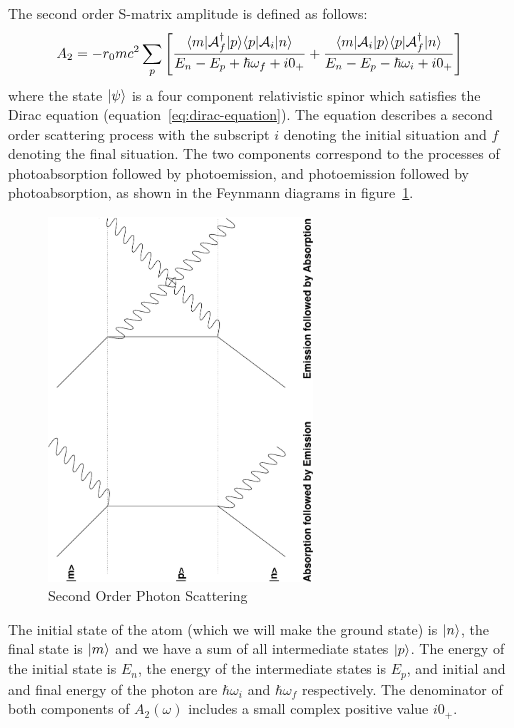 The second order S-matrix amplitude is defined as follows:
\begin{equation}
     A_2 = 
     -r_0 mc^2 \sum_p
     \left[
     \frac{
        \langle m| \mathcal{A}_f^\dag |p \rangle
        \langle p| \mathcal{A}_i |n \rangle
     }{
        E_n - E_p + \hbar\omega_f + i0_+
     }
     +
     \frac{
        \langle m| \mathcal{A}_i |p \rangle
        \langle p| \mathcal{A}_f^\dag |n \rangle
     }{
        E_n - E_p - \hbar\omega_i + i0_+
     }
     \right]
\end{equation}
where the state $|\psi \rangle$ is a four component relativistic spinor which
satisfies the Dirac equation (equation~\ref{eq:dirac-equation}). The equation describes a second
order scattering process with the subscript $i$ denoting the initial situation
and $f$ denoting the final situation. The two components correspond to the
processes of photoabsorption followed by photoemission, and photoemission
followed by photoabsorption, as shown in the Feynmann diagrams in 
figure~\ref{fig:feynmann}.
\begin{figure}[h]
    \begin{center}
        \includegraphics[angle=-90,width=7.0cm]{feynmann.eps}
    \end{center}
    \caption{Second Order Photon Scattering}
    \label{fig:feynmann}
\end{figure}

The initial state of the atom (which we will make
the ground state) is $|n \rangle$, the final state is $|m \rangle$ and we have
a sum of all intermediate states $|p \rangle$. The energy of the initial state is
$E_n$, the energy of the intermediate states is $E_p$, and initial and and final
energy of the photon are $\hbar \omega_i$ and $\hbar \omega_f$ respectively.
The denominator of both components of $A_2(\omega)$ includes a small complex
positive value $i0_+$.

